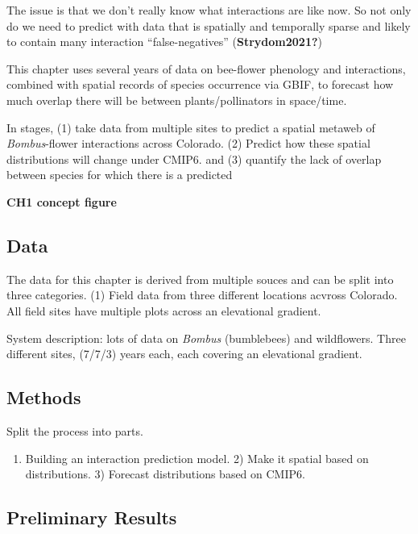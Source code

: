 \documentclass[11pt]{article}
\begin{document}
The issue is that we don't really know what interactions are like now.
So not only do we need to predict with data that is spatially and
temporally sparse and likely to contain many interaction
``false-negatives'' (\textbf{Strydom2021?})

This chapter uses several years of data on bee-flower phenology and
interactions, combined with spatial records of species occurrence via
GBIF, to forecast how much overlap there will be between
plants/pollinators in space/time.

In stages, (1) take data from multiple sites to predict a spatial
metaweb of \emph{Bombus}-flower interactions across Colorado. (2)
Predict how these spatial distributions will change under CMIP6. and (3)
quantify the lack of overlap between species for which there is a
predicted

\textbf{CH1 concept figure}

\hypertarget{data}{%
\subsection{Data}\label{data}}

The data for this chapter is derived from multiple souces and can be
split into three categories. (1) Field data from three different
locations acvross Colorado. All field sites have multiple plots across
an elevational gradient.

System description: lots of data on \emph{Bombus} (bumblebees) and
wildflowers. Three different sites, (7/7/3) years each, each covering an
elevational gradient.

\hypertarget{methods}{%
\subsection{Methods}\label{methods}}

Split the process into parts.

\begin{enumerate}
\def\labelenumi{\arabic{enumi})}
\tightlist
\item
  Building an interaction prediction model. 2) Make it spatial based on
  distributions. 3) Forecast distributions based on CMIP6.
\end{enumerate}

\hypertarget{preliminary-results}{%
\subsection{Preliminary Results}\label{preliminary-results}}
\end{document}

